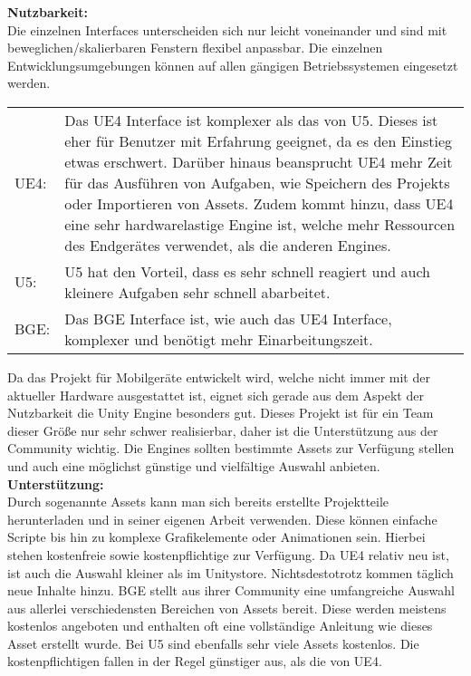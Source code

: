 \textbf{Nutzbarkeit:}\\
Die einzelnen Interfaces unterscheiden sich nur leicht voneinander und sind mit beweglichen/skalierbaren Fenstern flexibel anpassbar. Die einzelnen Entwicklungsumgebungen können auf allen gängigen Betriebssystemen eingesetzt werden.
\begin{table}[H]
\centering
\begin{tabular}{lp{14.5cm}}
\ac{UE4}:& 
Das \ac{UE4} Interface ist komplexer als das von \ac{U5}. Dieses ist eher für Benutzer mit Erfahrung geeignet, da es den Einstieg etwas erschwert. Darüber hinaus beansprucht \ac{UE4} mehr Zeit für das Ausführen von Aufgaben, wie Speichern des Projekts oder Importieren von Assets. Zudem kommt hinzu, dass \ac{UE4} eine sehr hardwarelastige Engine ist, welche mehr Ressourcen des Endgerätes verwendet, als die anderen Engines.\\
\ac{U5}:&
\ac{U5} hat den Vorteil, dass es sehr schnell reagiert und auch kleinere Aufgaben sehr schnell abarbeitet.\\  
\ac{BGE}:&
Das \ac{BGE} Interface ist, wie auch das \ac{UE4} Interface, komplexer und benötigt mehr Einarbeitungszeit.
\end{tabular}
\end{table}
Da das Projekt für Mobilgeräte entwickelt wird, welche nicht immer mit der aktueller Hardware ausgestattet ist, eignet sich gerade aus dem Aspekt der Nutzbarkeit die Unity Engine besonders gut.
Dieses Projekt ist für ein Team dieser Größe nur sehr schwer realisierbar, daher ist die Unterstützung aus der Community wichtig. Die Engines sollten bestimmte Assets zur Verfügung stellen und auch eine möglichst günstige und vielfältige Auswahl anbieten.\\

\textbf{Unterstützung:}\\
Durch sogenannte Assets kann man sich bereits erstellte Projektteile herunterladen und in seiner eigenen Arbeit verwenden. Diese können einfache Scripte bis hin zu komplexe Grafikelemente oder Animationen sein. Hierbei stehen kostenfreie sowie kostenpflichtige zur Verfügung. Da \ac{UE4} relativ neu ist, ist auch die Auswahl kleiner als im Unitystore. Nichtsdestotrotz kommen täglich neue Inhalte hinzu. \ac{BGE} stellt aus ihrer Community eine umfangreiche Auswahl aus allerlei verschiedensten Bereichen von Assets bereit. Diese werden meistens kostenlos angeboten und enthalten oft eine vollständige Anleitung wie dieses Asset erstellt wurde. Bei \ac{U5} sind ebenfalls sehr viele Assets kostenlos. Die kostenpflichtigen fallen in der Regel günstiger aus, als die von \ac{UE4}.

